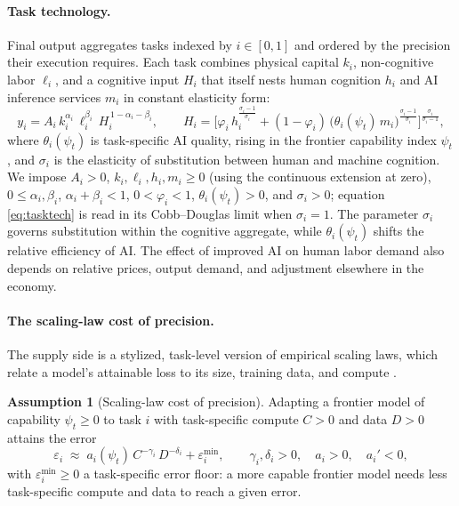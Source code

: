 \documentclass[12pt]{article}
\theoremstyle{plain}
\theoremstyle{definition}
\newtheorem{assumption}[proposition]{Assumption}
\theoremstyle{remark}
\begin{document}
\paragraph{Task technology.}
Final output aggregates tasks indexed by $i \in [0,1]$ and ordered by the
precision their execution requires. Each task combines physical capital $k_i$,
non-cognitive labor $\ell_i$, and a cognitive input $H_i$ that itself
nests human cognition $h_i$ and AI inference services $m_i$ in constant
elasticity form:
\begin{equation}\label{eq:tasktech}
y_i = A_i\, k_i^{\alpha_i}\, \ell_i^{\beta_i}\,
      H_i^{\,1-\alpha_i-\beta_i},
\qquad
H_i = \Big[ \varphi_i\, h_i^{\frac{\sigma_i-1}{\sigma_i}}
      + (1-\varphi_i)\,\big(\theta_i(\psi_t)\, m_i\big)^{\frac{\sigma_i-1}{\sigma_i}}
      \Big]^{\frac{\sigma_i}{\sigma_i-1}},
\end{equation}
where $\theta_i(\psi_t)$ is task-specific AI quality, rising in the
frontier capability index $\psi_t$, and $\sigma_i$ is the elasticity of
substitution between human and machine cognition. We impose $A_i>0$,
$k_i,\ell_i,h_i,m_i\ge0$ (using the continuous extension at zero),
$0\le\alpha_i,\beta_i$, $\alpha_i+\beta_i<1$, $0<\varphi_i<1$,
$\theta_i(\psi_t)>0$, and $\sigma_i>0$; equation
\eqref{eq:tasktech} is read in its Cobb--Douglas limit when $\sigma_i=1$.
The parameter $\sigma_i$ governs substitution within the cognitive
aggregate, while $\theta_i(\psi_t)$ shifts the relative efficiency of AI.
The effect of improved AI on human labor demand also depends on relative
prices, output demand, and adjustment elsewhere in the economy.

\paragraph{The scaling-law cost of precision.}
The supply side is a stylized, task-level version of empirical scaling
laws, which relate a model's attainable loss to its size, training data,
and compute \citep{Kaplan2020}.

\begin{assumption}[Scaling-law cost of precision]\label{ass:scaling}
Adapting a frontier model of capability $\psi_t\ge0$ to task $i$ with
task-specific compute $C>0$ and data $D>0$ attains the error
\begin{equation}\label{eq:scaling}
\varepsilon_i \;\approx\; a_i(\psi_t)\, C^{-\gamma_i}\, D^{-\delta_i}
              + \varepsilon_i^{\min},
\qquad \gamma_i, \delta_i > 0,\quad a_i > 0,\quad a_i' < 0,
\end{equation}
with $\varepsilon_i^{\min}\!\ge 0$ a task-specific error floor: a more
capable frontier model needs less task-specific compute and data to
reach a given error.
\end{assumption}
\end{document}
